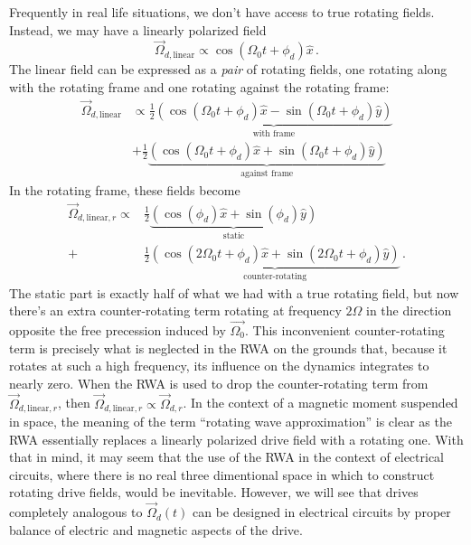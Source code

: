 Frequently in real life situations, we don't have access to true rotating fields.
Instead, we may have a linearly polarized field
\begin{equation*}
  \vec{\Omega}_{d,\text{linear}} \propto \cos(\Omega_0 t + \phi_d) \hat{x}
  \, .
\end{equation*}
The linear field can be expressed as a \emph{pair} of rotating fields, one rotating along with the rotating frame and one rotating against the rotating frame:
\begin{align*}
  \vec{\Omega}_{d, \text{linear}}
  &\propto \frac{1}{2} \underbrace{
    \left( \cos(\Omega_0 t + \phi_d) \hat{x} - \sin(\Omega_0 t + \phi_d) \hat{y} \right)
  }_\text{with frame} \\
  &+ \frac{1}{2} \underbrace{
    \left( \cos(\Omega_0 t + \phi_d) \hat{x} + \sin(\Omega_0 t + \phi_d) \hat{y} \right)
  }_\text{against frame}
\end{align*}
In the rotating frame, these fields become
\begin{align*}
  \vec{\Omega}_{d, \text{linear}, r}
  \propto& \frac{1}{2} \underbrace{
    \left( \cos(\phi_d) \hat{x} + \sin(\phi_d) \hat{y} \right)
    }_\text{static} \\
    +& \frac{1}{2} \underbrace{
      \left( \cos(2 \Omega_0 t + \phi_d) \hat{x} + \sin(2 \Omega_0 t + \phi_d) \hat{y} \right)
    }_\text{counter-rotating}
  \, .
\end{align*}
The static part is exactly half of what we had with a true rotating field, but now there's an extra counter-rotating term rotating at frequency $2 \Omega$ in the direction opposite the free precession induced by $\vec{\Omega_0}$.
This inconvenient counter-rotating term is precisely what is neglected in the RWA on the grounds that, because it rotates at such a high frequency, its influence on the dynamics integrates to nearly zero.
When the RWA is used to drop the counter-rotating term from $\vec{\Omega}_{d, \text{linear}, r}$, then $\vec{\Omega}_{d, \text{linear}, r} \propto \vec{\Omega}_{d,r}$.
In the context of a magnetic moment suspended in space, the meaning of the term ``rotating wave approximation'' is clear as the RWA essentially replaces a linearly polarized drive field with a rotating one.
With that in mind, it may seem that the use of the RWA in the context of electrical circuits, where there is no real three dimentional space in which to construct rotating drive fields, would be inevitable.
However, we will see that drives completely analogous to $\vec{\Omega}_d(t)$ can be designed in electrical circuits by proper balance of electric and magnetic aspects of the drive.
